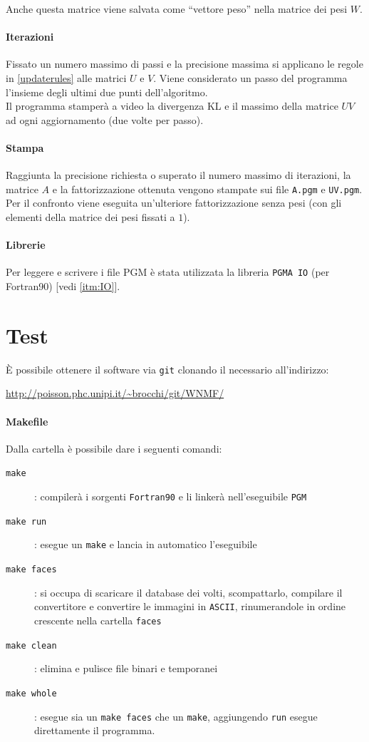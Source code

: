\documentclass[a4paper]{article} %
\begin{document}
Anche questa matrice viene salvata come ``vettore peso'' nella matrice dei pesi $W$.

\paragraph{Iterazioni}
Fissato un numero massimo di passi e la precisione massima si applicano le regole in \ref{updaterules} alle matrici $U$ e $V$. Viene considerato un passo del programma l'insieme degli ultimi due punti dell'algoritmo.\\
Il programma stamperà a video la divergenza KL e il massimo della matrice $UV$ ad ogni aggiornamento (due volte per passo).

\paragraph{Stampa}
Raggiunta la precisione richiesta o superato il numero massimo di iterazioni, la matrice $A$ e la fattorizzazione ottenuta vengono stampate sui file \texttt{A.pgm} e \texttt{UV.pgm}.
Per il confronto viene eseguita un'ulteriore fattorizzazione senza pesi (con gli elementi della matrice dei pesi fissati a $1$).

\paragraph{Librerie}
Per leggere e scrivere i file PGM è stata utilizzata la libreria \texttt{PGMA IO} (per Fortran90) [vedi \ref{itm:IO}].

\section{Test}
È possibile ottenere il software via \texttt{git} clonando il necessario all'indirizzo:
\begin{center} \url{http://poisson.phc.unipi.it/~brocchi/git/WNMF/} \end{center}

\paragraph{Makefile}\label{makefile}
Dalla cartella è possibile dare i seguenti comandi:
\begin{description}
\item[\texttt{make}]: compilerà i sorgenti \texttt{Fortran90} e li linkerà nell'eseguibile \texttt{PGM}
\item[\texttt{make run}]: esegue un \texttt{make} e lancia in automatico l'eseguibile
\item[\texttt{make faces}]: si occupa di scaricare il database dei volti, scompattarlo, compilare il convertitore e convertire le immagini in \texttt{ASCII}, rinumerandole in ordine crescente nella cartella \texttt{faces}
\item[\texttt{make clean}]: elimina e pulisce file binari e temporanei
\item[\texttt{make whole}]: esegue sia un \texttt{make faces} che un \texttt{make}, aggiungendo \texttt{run} esegue direttamente il programma.
\end{description}
\end{document}
